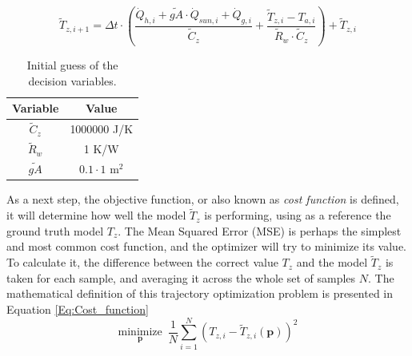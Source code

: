\begin{equation}
\tilde{T}_{z,i+1} = \Delta t \cdot \left( \frac{\dot{Q}_{h,i} + \tilde{gA} \cdot \dot{Q}_{sun, i} + \dot{Q}_{g,i}}{\tilde{C}_z} + \frac{\tilde{T}_{z,i}-T_{a,i}}{\tilde{R}_w \cdot \tilde{C}_z} \right) + \tilde{T}_{z,i}
\label{eq:finite_difference_model}
\end{equation}


\begin{table}[H]
\centering
\begin{tabular}{c|c}
Variable & Value\\
\hline
\hline
$\tilde{C}_z$ & 1000000 J/K\\
$\tilde{R}_w$ & 1 K/W\\
$\tilde{gA}$ & $0.1\cdot1$ m$^2$ 
\end{tabular}
\caption{Initial guess of the decision variables.}
\label{tab:initial_guess}
\end{table}

As a next step, the objective function, or also known as \emph{cost function} is defined, it will determine how well the model $\tilde{T}_{z}$ is performing, using as a reference the ground truth model $T_{z}$. The Mean Squared Error (MSE) is perhaps the simplest and most common cost function, and the optimizer will try to minimize its value. To calculate it, the difference between the correct value $T_{z}$ and the model $\tilde{T}_{z}$ is taken for each sample, and averaging it across the whole set of samples $N$. The mathematical definition of this trajectory optimization problem is presented in Equation \ref{Eq:Cost_function}
\begin{equation}
\underset{\mathbf{p}}{\text{minimize}}\,\,\,\frac{1}{N}\sum_{i=1}^{N} (T_{z,i}-\tilde{T}_{z,i}(\mathbf{p}))^2 
\label{Eq:Cost_function}
\end{equation}

